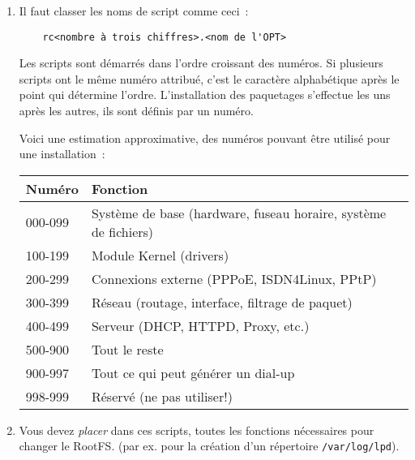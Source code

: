     \begin{enumerate}
    \item Il faut classer les noms de script comme ceci~:

\begin{example}
\begin{verbatim}
    rc<nombre à trois chiffres>.<nom de l'OPT>
\end{verbatim}
\end{example}

    Les scripts sont démarrés dans l'ordre croissant des numéros.
    Si plusieurs scripts ont le même numéro attribué, c’est le caractère
    alphabétique après le point qui détermine l'ordre. L’installation des
    paquetages s’effectue les uns après les autres, ils sont définis par un numéro.

          Voici une estimation approximative, des numéros pouvant être utilisé
          pour une installation~:

          \begin{table}[htbp]
          \centering
          \begin{tabular}{ll}
                  \hline
                  Numéro        &       Fonction \\
                  \hline
                  \hline
                  000-099       &       Système de base (hardware, fuseau horaire, système de fichiers) \\
                  100-199       &       Module Kernel (drivers) \\
                  200-299       &       Connexions externe (PPPoE, ISDN4Linux, PPtP) \\
                  300-399       &       Réseau (routage, interface, filtrage de paquet) \\
                  400-499       &       Serveur (DHCP, HTTPD, Proxy, etc.) \\
                  500-900       &       Tout le reste \\
                  900-997       &       Tout ce qui peut générer un dial-up \\
                  998-999       &       Réservé (ne pas utiliser!) \\
                  \hline
          \end{tabular}
          \end{table}

    \item Vous devez \emph{placer} dans ces scripts, toutes les fonctions
    nécessaires pour changer le RootFS. (par ex. pour la création d'un
    répertoire \texttt{/var/log/lpd}).


\end{enumerate}
